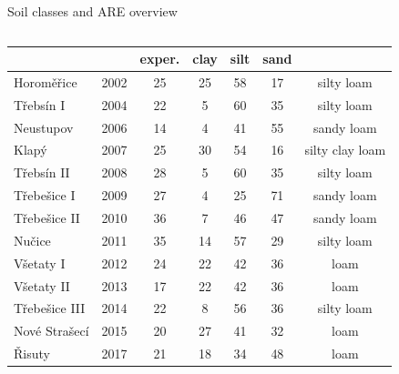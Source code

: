 \begin{block}{Soil classes and ARE overview}
\begin{columns}
\begin{column}{0.6\textwidth}
{\begin{table}[]
\begin{tabular}{lcccccc}
                            &         & exper.       & clay  & silt  & sand &  \\
                \hline
                Horoměřice    & 2002    & 25                & 25             & 58            & 17            & silty loam      \\
                Třebsín I     & 2004    & 22                & 5              & 60            & 35            & silty loam      \\
                Neustupov     & 2006    & 14                & 4              & 41            & 55            & sandy loam      \\
                Klapý         & 2007    & 25                & 30             & 54            & 16            & silty clay loam \\
                Třebsín II    & 2008    & 28                & 5              & 60            & 35            & silty loam      \\
                Třebešice I   & 2009    & 27                & 4              & 25            & 71            & sandy loam      \\
                Třebešice II  & 2010    & 36                & 7              & 46            & 47            & sandy loam      \\
                Nučice        & 2011    & 35                & 14             & 57            & 29            & silty loam      \\
                Všetaty I     & 2012    & 24                & 22             & 42            & 36            & loam            \\
                Všetaty II    & 2013    & 17                & 22             & 42            & 36            & loam            \\
                Třebešice III & 2014    & 22                & 8              & 56            & 36            & silty loam      \\
                Nové Strašecí & 2015    & 20                & 27             & 41            & 32            & loam            \\
                Řisuty        & 2017    & 21                & 18             & 34            & 48            & loam           \\
                \hline
                \hline
                \end{tabular}
            \end{table}
            }
        \end{column}
    \end{columns}
\end{block}



        
